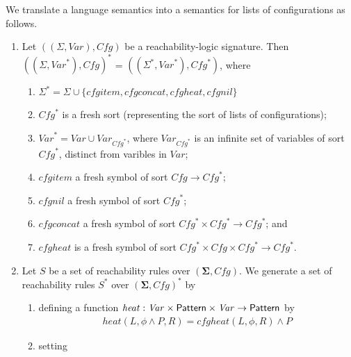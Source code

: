 \begin{definition}\label{def:starextension}
We translate a language semantics into a semantics for lists of configurations as follows.
\begin{enumerate}
    \item Let $((\Sigma, \mathit{Var}), \mathit{Cfg})$ be a reachability-logic signature.
          Then $((\Sigma, \mathit{Var}^*), \mathit{Cfg})^*$ = $((\Sigma^*, \mathit{Var}^*), \mathit{Cfg}^*)$,
          where
          \begin{enumerate}
              \item $\Sigma^* = \Sigma \cup \{ \mathit{cfgitem}, \mathit{cfgconcat}, \mathit{cfgheat}, \mathit{cfgnil} \}$
              \item $\mathit{Cfg}^*$ is a fresh sort (representing the sort of lists of configurations);
              \item $\mathit{Var}^* = \mathit{Var} \cup \mathit{Var}_{\mathit{Cfg}^*}$,
              where $\mathit{Var}_{\mathit{Cfg}^*}$ is an infinite set of variables of sort $\mathit{Cfg}^*$,
              distinct from varibles in $\mathit{Var}$;
              \item $\mathit{cfgitem}$ a fresh symbol of sort $\mathit{Cfg} \to \mathit{Cfg}^*$;
              \item $\mathit{cfgnil}$ a fresh symbol of sort $\mathit{Cfg}^*$;
              \item $\mathit{cfgconcat}$ a fresh symbol of sort $\mathit{Cfg}^* \times \mathit{Cfg}^* \to \mathit{Cfg}^*$; and
              \item $\mathit{cfgheat}$ is a fresh symbol of sort $\mathit{Cfg}^* \times \mathit{Cfg} \times \mathit{Cfg}^* \to \mathit{Cfg}^*$.
          \end{enumerate}
    \item Let $S$ be a set of reachability rules over $(\mathbf{\Sigma}, \mathit{Cfg})$.
          We generate a set of reachability rules $S^*$ over $(\mathbf{\Sigma}, \mathit{Cfg})^*$
          by
          \begin{enumerate}
              \item defining a function $\mathit{heat} : \mathit{Var} \times \mathsf{Pattern} \times \mathit{Var} \to \mathsf{Pattern}$ by
              \begin{align*}
                  \mathit{heat}(L, \phi \land P, R)
                  = \mathit{cfgheat}(L, \phi, R) \land P
              \end{align*}
              \item setting

\end{enumerate}
\end{enumerate}
\end{definition}
